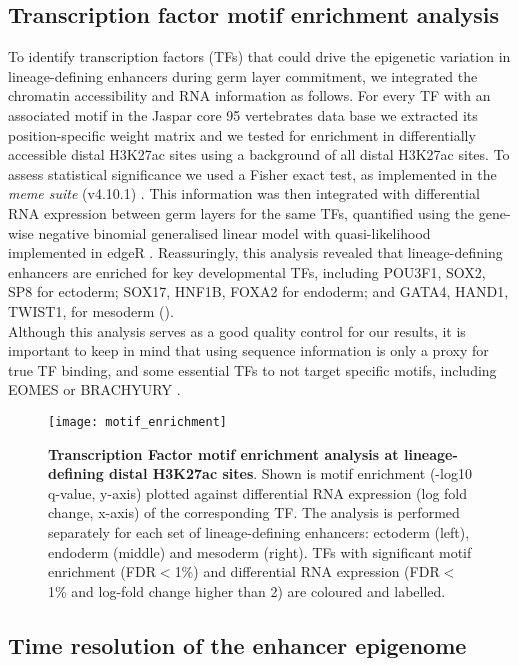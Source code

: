 \subsection{Transcription factor motif enrichment analysis}

To identify transcription factors (TFs) that could drive the epigenetic variation in lineage-defining enhancers during germ layer commitment, we integrated the chromatin accessibility and RNA information as follows. For every TF with an associated motif in the Jaspar core 95 vertebrates data base we extracted its position-specific weight matrix and we tested for enrichment in differentially accessible distal H3K27ac sites using a background of all distal H3K27ac sites. To assess statistical significance we used a Fisher exact test, as implemented in the \textit{meme suite} (v4.10.1) \cite{Bailey2009}. This information was then integrated with differential RNA expression between germ layers for the same TFs, quantified using the gene-wise negative binomial generalised linear model with quasi-likelihood implemented in edgeR \cite{McCarthy2012}. Reassuringly, this analysis revealed that lineage-defining enhancers are enriched for key developmental TFs, including POU3F1, SOX2, SP8 for ectoderm; SOX17, HNF1B, FOXA2 for endoderm; and GATA4, HAND1, TWIST1, for mesoderm ().\\
Although this analysis serves as a good quality control for our results, it is important to keep in mind that using sequence information is only a proxy for true TF binding, and some essential TFs to not target specific motifs, including EOMES or BRACHYURY \cite{Tosic2019}.

\begin{figure}[H]
	\centering
	\texttt{[image: motif\_enrichment]}
	\caption[]{
	\textbf{Transcription Factor motif enrichment analysis at lineage-defining distal H3K27ac sites}. Shown is motif enrichment (-log10 q-value, y-axis) plotted against differential RNA expression (log fold change, x-axis) of the corresponding TF. The analysis is performed separately for each set of lineage-defining enhancers: ectoderm (left), endoderm (middle) and mesoderm (right). TFs with significant motif enrichment (FDR$<$1\%) and differential RNA expression (FDR$<$1\% and log-fold change higher than 2) are coloured and labelled. }
	\label{fig:motif_enrichment}
\end{figure}


\subsection{Time resolution of the enhancer epigenome}

